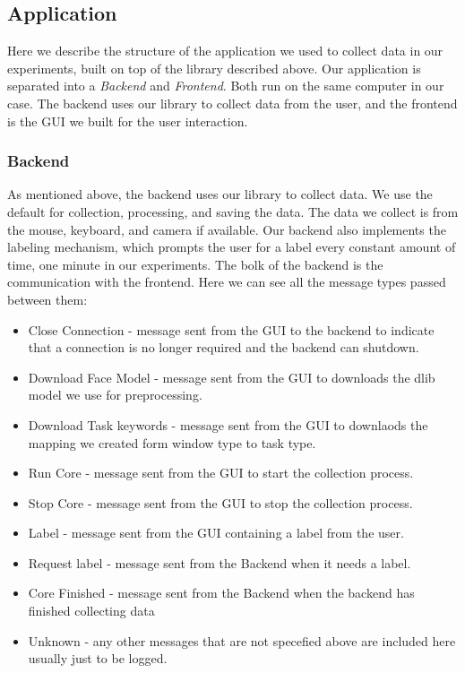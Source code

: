 \subsection{Application}


Here we describe the structure of the application we used to collect data in our experiments, built on top of the library described above. 
Our application is separated into a \textit{Backend} and \textit{Frontend}. Both run on the same computer in our case. 
The backend uses our library to collect data from the user, and the frontend is the GUI we built for the user interaction.

\subsubsection{Backend}
As mentioned above, the backend uses our library to collect data. We use the default for collection, processing, and saving the data. 
The data we collect is from the mouse, keyboard, and camera if available. Our backend also implements the labeling mechanism, 
which prompts the user for a label every constant amount of time, one minute in our experiments.
The bolk of the backend is the communication with the frontend. Here we can see all the message types passed between them:

\begin{itemize}
    \item Close Connection - message sent from the GUI to the backend to indicate that a connection is no longer required and the backend can shutdown.
    \item Download Face Model - message sent from the GUI to downloads the dlib model we use for preprocessing.
    \item Download Task keywords - message sent from the GUI to downlaods the mapping we created form window type to task type.
    \item Run Core - message sent from the GUI to start the collection process.
    \item Stop Core - message sent from the GUI to stop the collection process.
    \item Label - message sent from the GUI containing a label from the user.
    \item Request label - message sent from the Backend when it needs a label.
    \item Core Finished - message sent from the Backend when the backend has finished collecting data
    \item Unknown - any other messages that are not specefied above are included here usually just to be logged.
\end{itemize}

